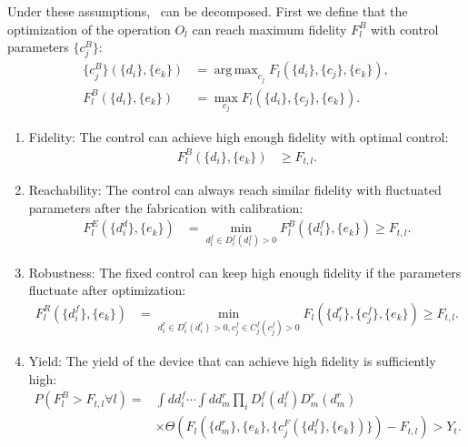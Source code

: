 \documentclass[a4paper,onecolumn,11pt,unpublished]{quantumarticle}
\DeclareMathOperator*{\argmax}{arg\,max}
\newcommand{\setelem}[1]{\ensuremath{\{#1\}}}
\newcommand{\setelemtwo}[2]{\setelem{#1},\setelem{#2}}
\newcommand{\setelemthree}[3]{\setelem{#1},\setelem{#2},\setelem{#3}}
\begin{document}
Under these assumptions,~ can be decomposed. First we define that the optimization of the operation $O_l$ can reach maximum fidelity $F^B_l$ with control parameters $\setelem{c_j^B}$:
\begin{align}
  \setelem{c_j^B}(\setelemtwo{d_i}{e_k}) & = \argmax_{c_j} F_l(\setelemthree{d_i}{c_j}{e_k}),                                         \\
  F^B_l(\setelemtwo{d_i}{e_k})           & = \max_{c_j} F_l(\setelemthree{d_i}{c_j}{e_k}). \label{eq:design_criteria_optimal_control}
\end{align}
\begin{enumerate}
  \item Fidelity: The control can achieve high enough fidelity with optimal control:
        \begin{align}
          F^B_l(\setelemtwo{d_i}{e_k}) & \ge F_{t,l}.\label{eq:design_criteria_fidelity_one_point}
        \end{align}
  \item Reachability: The control can always reach similar fidelity with fluctuated parameters after the fabrication with calibration:
        \begin{align}
          F^E_l(\setelemtwo{d^d_i}{e_k}) & = \min_{d^f_i\in D^f_i(d^f_i) > 0} F^B_l(\setelemtwo{d^f_i}{e_k}) \ge F_{t,l}. \label{eq:design_criteria_reachable}
        \end{align}
  \item Robustness: The fixed control can keep high enough fidelity if the parameters fluctuate after optimization:
        \begin{align}
          F^R_l(\setelemtwo{d^f_i}{e_k}) & = \min_{d^r_i\in D^r_i(d^r_i) > 0, c^f_j\in C^f_j(c^f_j)>0} F_l(\setelemthree{d^r_i}{c^f_j}{e_k}) \ge F_{t,l}. \label{eq:design_criteria_robust}
        \end{align}
  \item Yield: The yield of the device that can achieve high fidelity is sufficiently high: 
        \begin{align}
          P(F^B_l > F_{t,l} \forall l)  = & \int d d^f_i \cdots \int d d^r_m \prod_i D^f_i(d^f_i) D^r_m(d^r_m) 
          \nonumber\\ 
          & \times \Theta(F_l(\setelemthree{d^r_m}{e_k}{c_j^F(\setelem{d^f_i},\setelem{e_k})})-F_{t,l}) > Y_t. \label{eq:design_criteria_yield_opt_fidelity}
        \end{align}
\end{enumerate}
\end{document}
